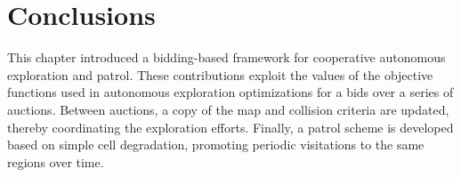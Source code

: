 \section{Conclusions}

This chapter introduced a bidding-based framework for cooperative autonomous exploration and patrol. These contributions exploit the values of the objective functions used in autonomous exploration optimizations for a bids over a series of auctions. Between auctions, a copy of the map and collision criteria are updated, thereby coordinating the exploration efforts. Finally, a patrol scheme is developed based on simple cell degradation, promoting periodic visitations to the same regions over time.



